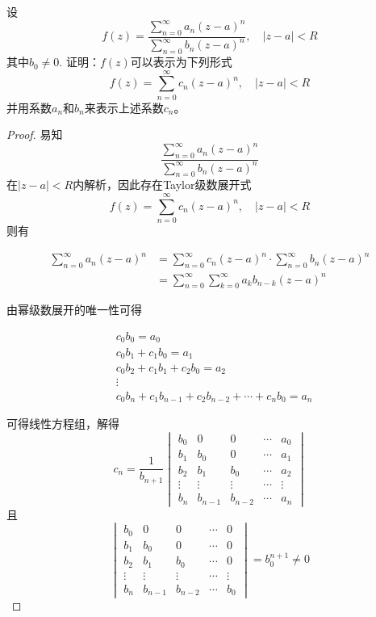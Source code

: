 \begin{proposition}

    设
    $$f(z) = \dfrac{\sum\limits_{n = 0}^{\infty}{a_n(z - a)^n}}{\sum\limits_{n = 0}^{\infty}{b_n(z - a)^n}}, \quad |z - a| < R$$
    其中$b_0 \neq 0$. 证明：$f(z)$可以表示为下列形式
    $$f(z) = \sum\limits_{n = 0}^{\infty}{c_n(z - a)^n}, \quad |z - a| < R$$
    并用系数$a_n$和$b_n$来表示上述系数$c_n$。

\end{proposition}

\begin{proof}

    易知
    $$\dfrac{\sum\limits_{n = 0}^{\infty}{a_n(z - a)^n}}{\sum\limits_{n = 0}^{\infty}{b_n(z - a)^n}}$$
    在$|z - a| < R$内解析，因此存在\textup{Taylor}级数展开式
    $$f(z) = \sum\limits_{n = 0}^{\infty}{c_n(z - a)^n}, \quad |z - a| < R$$
    则有

    \begin{align*}
        \sum\limits_{n = 0}^{\infty}{a_n(z - a)^n} & = \sum\limits_{n = 0}^{\infty}{c_n(z - a)^n} \cdot \sum\limits_{n = 0}^{\infty}{b_n(z - a)^n} \\
        & = \sum\limits_{n = 0}^{\infty}{\sum\limits_{k = 0}^{\infty}{a_kb_{n - k}(z - a)^n}}
    \end{align*}

    由幂级数展开的唯一性可得

    \begin{align*}
        & c_0 b_0 = a_0 \\
        & c_0 b_1 + c_1 b_0 = a_1 \\
        & c_0 b_2 + c_1 b_1 + c_2 b_0 = a_2 \\
        & \vdots \\
        & c_0 b_n + c_1 b_{n - 1} + c_2 b_{n - 2} + \cdots + c_n b_0 = a_n
    \end{align*}

    可得线性方程组，解得
    $$c_n = \dfrac{1}{b_{n + 1}}
    \begin{vmatrix} 
        b_0 & 0 & 0 & \cdots & a_0 \\
        b_1 & b_0 & 0 & \cdots & a_1 \\
        b_2 & b_1 & b_0 & \cdots & a_2 \\
        \vdots & \vdots & \vdots & \cdots & \vdots \\
        b_n & b_{n - 1} & b_{n - 2} & \cdots & a_n
    \end{vmatrix}$$
    且
    $$\begin{vmatrix} 
        b_0 & 0 & 0 & \cdots & 0 \\
        b_1 & b_0 & 0 & \cdots & 0 \\
        b_2 & b_1 & b_0 & \cdots & 0 \\
        \vdots & \vdots & \vdots & \cdots & \vdots \\
        b_n & b_{n - 1} & b_{n - 2} & \cdots & b_0
    \end{vmatrix} = b_0^{n + 1} \neq 0$$

\end{proof}

